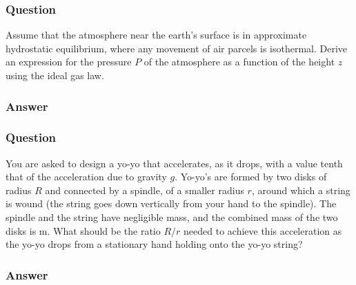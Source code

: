 \subsubsection{Question}
Assume that the atmosphere near the earth’s surface is in approximate hydrostatic equilibrium, where any movement of air parcels is isothermal. Derive an expression for the pressure $P$ of the atmosphere as a function of the height $z$ using the ideal gas law.

\subsubsection{Answer}


\subsubsection{Question}
You are asked to design a yo-yo that accelerates, as it drops, with a value tenth that of the acceleration due to gravity $g$. Yo-yo's are formed by two disks of radius $R$ and connected by a spindle, of a smaller radius $r$, around which a string is wound (the string goes down vertically from your hand to the spindle). The spindle and the string have negligible mass, and the combined mass of the two disks is m. What should be the ratio $R/r$ needed to achieve this acceleration as the yo-yo drops from a stationary hand holding onto the yo-yo string?

\subsubsection{Answer}




